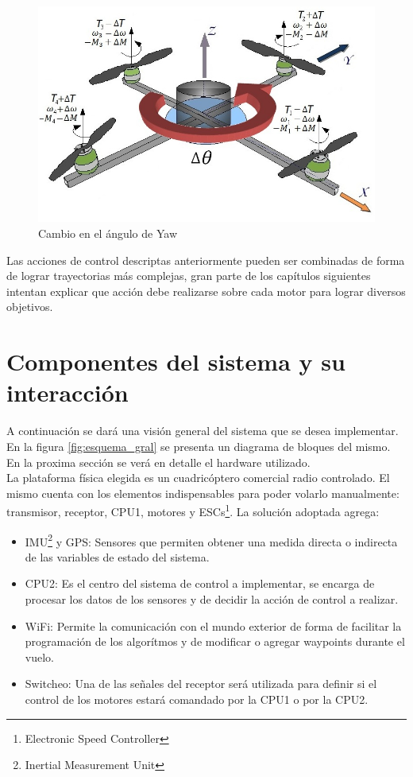 \documentclass[main]{subfiles}
\begin{document}
\begin{figure}[!h]
\centering
\includegraphics[scale=0.4]{./pics_general/quad_theta.jpg}
\caption{Cambio en el \'angulo de Yaw}
\label{fig:quad_theta}
\end{figure}
Las acciones de control descriptas anteriormente pueden ser combinadas de forma de lograr trayectorias m\'as complejas, gran parte de los cap\'itulos siguientes intentan explicar que acci\'on debe realizarse sobre cada motor para lograr diversos objetivos.

\section{Componentes del sistema y su interacci\'on}

A continuaci\'on se dar\'a una visi\'on general del sistema que se desea implementar. En la figura \ref{fig:esquema_gral} se presenta un diagrama de bloques del mismo. En la proxima secci\'on se ver\'a en detalle el hardware utilizado.\\

La plataforma f\'isica elegida es un cuadric\'optero comercial radio controlado. El mismo cuenta con los elementos indispensables para poder volarlo manualmente: transmisor, receptor, CPU1, motores y ESCs\footnote{Electronic Speed Controller}. La soluci\'on adoptada agrega:
\begin{itemize}
\item IMU\footnote{Inertial Measurement Unit} y GPS: Sensores que permiten obtener una medida directa o indirecta de las variables de estado del sistema. 
\item CPU2: Es el centro del sistema de control a implementar, se encarga de procesar los datos de los sensores y de decidir la acci\'on de control a realizar. 
\item WiFi: Permite la comunicaci\'on con el mundo exterior de forma de facilitar la programaci\'on de los algor\'itmos y de modificar o agregar waypoints durante el vuelo. 
\item Switcheo: Una de las señales del receptor ser\'a utilizada para definir si el control de los motores estar\'a comandado por la CPU1 o por la CPU2. 
\end{itemize}
\end{document}
